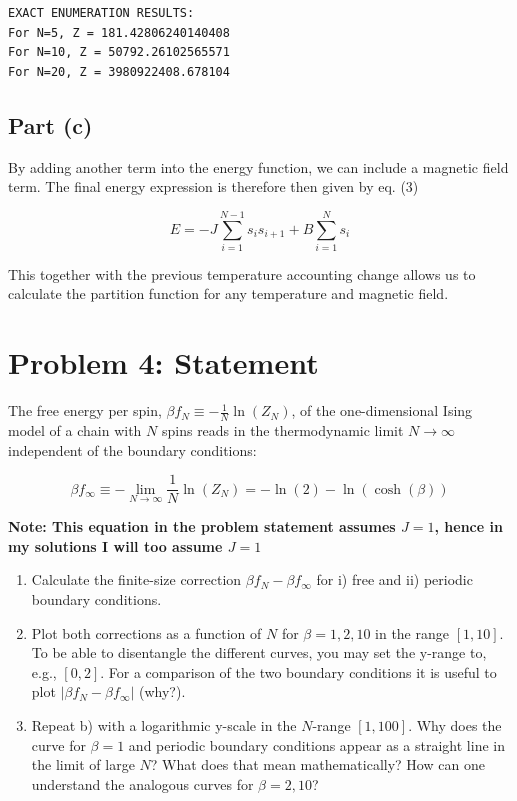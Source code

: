 ﻿\documentclass[11pt]{article}
\begin{document}
    \begin{Verbatim}[commandchars=\\\{\}]
EXACT ENUMERATION RESULTS:
For N=5, Z = 181.42806240140408
For N=10, Z = 50792.26102565571
For N=20, Z = 3980922408.678104
    \end{Verbatim}

    \subsection*{Part (c)}

By adding another term into the energy function, we can include a
magnetic field term. The final energy expression is therefore then given
by eq. (3)

\[
E=-J \sum_{i=1}^{N-1}s_i s_{i+1} + B\sum_{i=1}^{N}s_i \tag{3}
\]

This together with the previous temperature accounting change allows us
to calculate the partition function for any temperature and magnetic
field.

    \section*{Problem 4: Statement}\label{problem-4-statement}

The free energy per spin, \(\beta f_N \equiv -\frac{1}{N}\ln(Z_N)\), of
the one-dimensional Ising model of a chain with \(N\) spins reads in the
thermodynamic limit \(N \to \infty\) independent of the boundary
conditions:

\[
\beta f_{\infty} \equiv -\lim_{N \to \infty} \frac{1}{N}\ln(Z_N)=-\ln(2)-\ln(\cosh(\beta))
\]

\textbf{Note: This equation in the problem statement assumes \(J=1\),
hence in my solutions I will too assume \(J=1\)}

\begin{enumerate}
\def\labelenumi{\alph{enumi})}
\item
  Calculate the finite-size correction \(\beta f_N - \beta f_{\infty}\)
  for i) free and ii) periodic boundary conditions.
\item
  Plot both corrections as a function of \(N\) for \(\beta = 1, 2, 10\)
  in the range \([1, 10]\). To be able to disentangle the different
  curves, you may set the y-range to, e.g., \([0, 2]\). For a comparison
  of the two boundary conditions it is useful to plot
  \(|\beta f_N - \beta f_{\infty}|\) (why?).
\item
  Repeat b) with a logarithmic y-scale in the \(N\)-range \([1, 100]\).
  Why does the curve for \(\beta = 1\) and periodic boundary conditions
  appear as a straight line in the limit of large \(N\)? What does that
  mean mathematically? How can one understand the analogous curves for
  \(\beta = 2, 10\)?
\end{enumerate}
\end{document}
